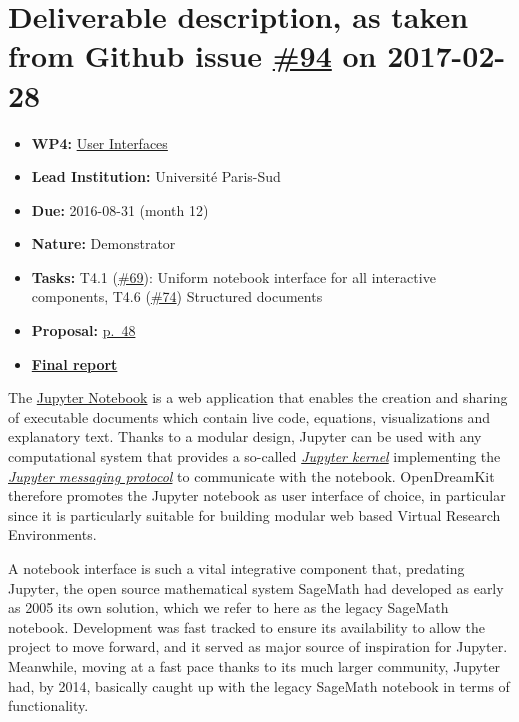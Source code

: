 \section*{\texorpdfstring{Deliverable description, as taken from Github
issue
\href{https://github.com/OpenDreamKit/OpenDreamKit/issues/94}{\#94} on
2017-02-28}{Deliverable description, as taken from Github issue \#94 on 2017-02-28}}\label{deliverable-description-as-taken-from-github-issue-94-on-2017-02-28}

\begin{itemize}
\tightlist
\item
  \textbf{WP4:}
  \href{https://github.com/OpenDreamKit/OpenDreamKit/tree/master/WP4}{User
  Interfaces}
\item
  \textbf{Lead Institution:} Université Paris-Sud
\item
  \textbf{Due:} 2016-08-31 (month 12)
\item
  \textbf{Nature:} Demonstrator
\item
  \textbf{Tasks:} T4.1
  (\href{https://github.com/OpenDreamKit/OpenDreamKit/issues/69}{\#69}):
  Uniform notebook interface for all interactive components, T4.6
  (\href{https://github.com/OpenDreamKit/OpenDreamKit/issues/74}{\#74})
  Structured documents
\item
  \textbf{Proposal:}
  \href{https://github.com/OpenDreamKit/OpenDreamKit/raw/master/Proposal/proposal-www.pdf}{p.~48}
\item
  \textbf{\href{https://github.com/OpenDreamKit/OpenDreamKit/raw/master/WP4/D4.5/report-final.pdf}{Final
  report}}
\end{itemize}

The \href{https://jupyter.org}{Jupyter Notebook} is a web application
that enables the creation and sharing of executable documents which
contain live code, equations, visualizations and explanatory text.
Thanks to a modular design, Jupyter can be used with any computational
system that provides a so-called
\href{https://jupyter.readthedocs.io/en/latest/projects/kernels.html}{\emph{Jupyter
kernel}} implementing the
\href{https://jupyter-client.readthedocs.io/en/latest/}{\emph{Jupyter
messaging protocol}} to communicate with the notebook. OpenDreamKit
therefore promotes the Jupyter notebook as user interface of choice, in
particular since it is particularly suitable for building modular web
based Virtual Research Environments.

A notebook interface is such a vital integrative component that,
predating Jupyter, the open source mathematical system SageMath had
developed as early as 2005 its own solution, which we refer to here as
the legacy SageMath notebook. Development was fast tracked to ensure its
availability to allow the project to move forward, and it served as
major source of inspiration for Jupyter. Meanwhile, moving at a fast
pace thanks to its much larger community, Jupyter had, by 2014,
basically caught up with the legacy SageMath notebook in terms of
functionality.

